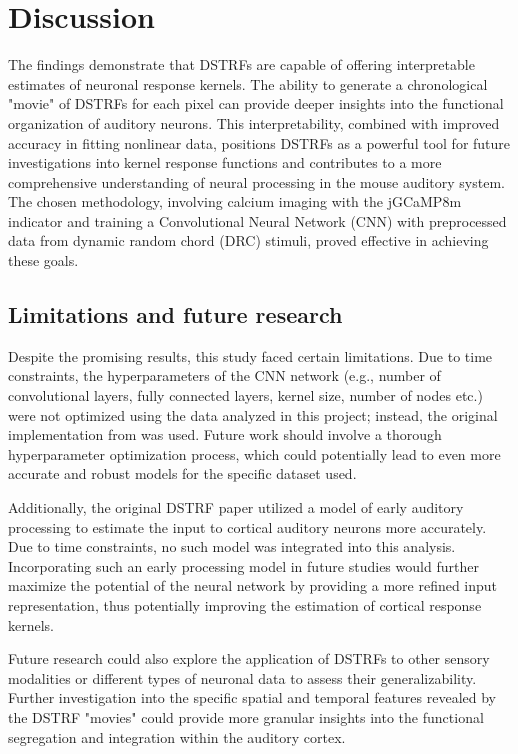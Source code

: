 \chapter{Discussion}\label{discussion}

The findings demonstrate that DSTRFs are capable of offering interpretable estimates of neuronal response kernels. The ability to generate a chronological "movie" of DSTRFs for each pixel can provide deeper insights into the functional organization of auditory neurons. This interpretability, combined with improved accuracy in fitting nonlinear data, positions DSTRFs as a powerful tool for future investigations into kernel response functions and contributes to a more comprehensive understanding of neural processing in the mouse auditory system. The chosen methodology, involving calcium imaging with the jGCaMP8m indicator and training a Convolutional Neural Network (CNN) with preprocessed data from dynamic random chord (DRC) stimuli, proved effective in achieving these goals.


\section{Limitations and future research}
Despite the promising results, this study faced certain limitations. Due to time constraints, the hyperparameters of the CNN network (e.g., number of convolutional layers, fully connected layers, kernel size, number of nodes etc.) were not optimized using the data analyzed in this project; instead, the original implementation from \textcite{keshishianEstimatingInterpretingNonlinear2020} was used. Future work should involve a thorough hyperparameter optimization process, which could potentially lead to even more accurate and robust models for the specific dataset used.

Additionally, the original DSTRF paper \parencite{keshishianEstimatingInterpretingNonlinear2020} utilized a model of early auditory processing \parencite{yangAuditoryRepresentationsAcoustic1992} to estimate the input to cortical auditory neurons more accurately. Due to time constraints, no such model was integrated into this analysis. Incorporating such an early processing model in future studies would further maximize the potential of the neural network by providing a more refined input representation, thus potentially improving the estimation of cortical response kernels.

Future research could also explore the application of DSTRFs to other sensory modalities or different types of neuronal data to assess their generalizability. Further investigation into the specific spatial and temporal features revealed by the DSTRF "movies" could provide more granular insights into the functional segregation and integration within the auditory cortex.

